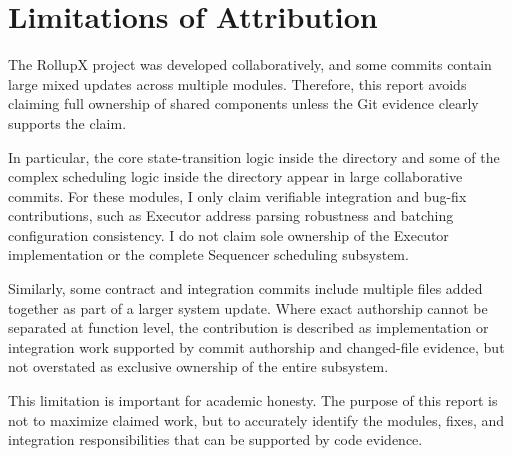 \section{Limitations of Attribution}

The RollupX project was developed collaboratively, and some commits contain large mixed updates across multiple modules. Therefore, this report avoids claiming full ownership of shared components unless the Git evidence clearly supports the claim.

In particular, the core state-transition logic inside the  directory and some of the complex scheduling logic inside the  directory appear in large collaborative commits. For these modules, I only claim verifiable integration and bug-fix contributions, such as Executor address parsing robustness and batching configuration consistency. I do not claim sole ownership of the Executor implementation or the complete Sequencer scheduling subsystem.

Similarly, some contract and integration commits include multiple files added together as part of a larger system update. Where exact authorship cannot be separated at function level, the contribution is described as implementation or integration work supported by commit authorship and changed-file evidence, but not overstated as exclusive ownership of the entire subsystem.

This limitation is important for academic honesty. The purpose of this report is not to maximize claimed work, but to accurately identify the modules, fixes, and integration responsibilities that can be supported by code evidence.

